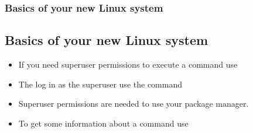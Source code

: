 \begin{frame}
	\frametitle{Basics of your new Linux system}
	\subsection{Basics of your new Linux system}
	
	\begin{itemize}
		\item If you need superuser permissions to execute a command use 
		\item The log in as the superuser use the command 
		\item Superuser permissions are needed to use your package manager.
		\item To get some information about a command use 
	\end{itemize}
\end{frame}
